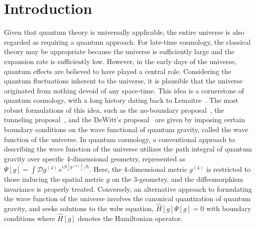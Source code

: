 \documentclass[superscriptaddress,aps,preprintnumbers,nofootinbib]{revtex4-2}
\begin{document}
\section{Introduction}


Given that quantum theory is universally applicable, the entire universe is also regarded as requiring a quantum approach. For late-time cosmology, the classical theory may be appropriate because the universe is sufficiently large and the expansion rate is sufficiently low. However, in the early days of the universe, quantum effects are believed to have played a central role. Considering the quantum fluctuations inherent to the universe, it is plausible that the universe originated from nothing devoid of any space-time. This idea is a cornerstone of quantum cosmology, with a long history dating back to Lemaitre~\cite{Lemaitre:1931zzb}. The most robust formulations of this idea, such as the no-boundary proposal~\cite{Hartle:1983ai}, the tunneling proposal~\cite{Vilenkin:1984wp}, and the DeWitt’s proposal~\cite{DeWitt:1967yk} are given by imposing certain boundary conditions on the wave functional of quantum gravity, called the wave function of the universe. In quantum cosmology, a conventional approach to describing the wave function of the universe utilizes the path integral of quantum gravity over specific $4$-dimensional geometry, represented as $\Psi[g]=\int\mathcal{D} g^{(4)}\, e^{i S[g^{(4)}]/\hbar}$. Here, the $4$-dimensional metric $g^{(4)}$ is restricted to those inducing the spatial metric $g$ on the $3$-geometry, and the diffeomorphism invariance is properly treated. Conversely, an alternative approach to formulating the wave function of the universe involves the canonical quantization of quantum gravity, and seeks solutions to the \ac{wdw} equation, $\hat{H}[g]\Psi[g]=0$ with boundary conditions where $\hat{H}[g]$ denotes the Hamiltonian operator. 
\end{document}
